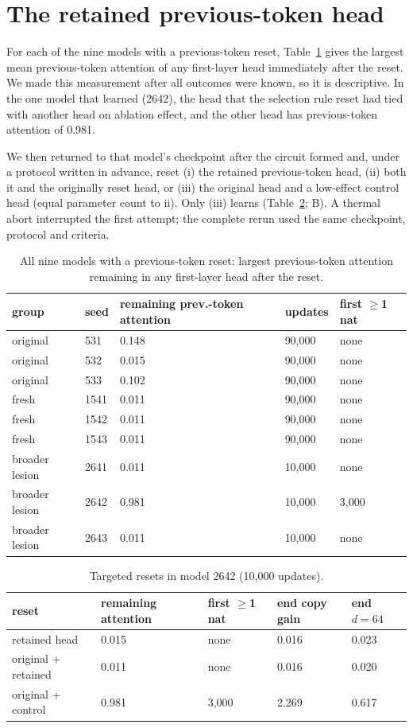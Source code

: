 \section{The retained previous-token head}
\label{app:retained}
For each of the nine models with a previous-token reset, Table~\ref{tab:readiness}
gives the largest mean previous-token attention of any first-layer head immediately
after the reset. We made this measurement after all outcomes were known, so it is
descriptive. In the one model that learned (2642), the head that the selection rule
reset had tied with another head on ablation effect, and the other head has
previous-token attention of 0.981.

We then returned to that model's checkpoint after the circuit formed and, under a
protocol written in advance, reset (i) the retained previous-token head, (ii) both
it and the originally reset head, or (iii) the original head and a low-effect
control head (equal parameter count to ii). Only (iii) learns
(Table~\ref{tab:retained}; B). A thermal abort interrupted the
first attempt; the complete rerun used the same checkpoint, protocol and criteria.

\begin{table}[!htbp]
\centering\small
\caption{All nine models with a previous-token reset: largest previous-token
attention remaining in any first-layer head after the reset.}
\label{tab:readiness}
\begin{tabular}{lllll}\toprule
group & seed & remaining prev.-token attention & updates & first $\ge$1 nat \\
\midrule
original & 531 & 0.148 & 90,000 & none \\
original & 532 & 0.015 & 90,000 & none \\
original & 533 & 0.102 & 90,000 & none \\
fresh & 1541 & 0.011 & 90,000 & none \\
fresh & 1542 & 0.011 & 90,000 & none \\
fresh & 1543 & 0.011 & 90,000 & none \\
broader lesion & 2641 & 0.011 & 10,000 & none \\
broader lesion & 2642 & 0.981 & 10,000 & 3,000 \\
broader lesion & 2643 & 0.011 & 10,000 & none \\
\bottomrule\end{tabular}
\end{table}

\begin{table}[!htbp]
\centering\small
\caption{Targeted resets in model 2642 (10,000 updates).}
\label{tab:retained}
\begin{tabular}{lllll}\toprule
reset & remaining attention & first $\ge$1 nat & end copy gain & end $d{=}64$ \\
\midrule
retained head & 0.015 & none & 0.016 & 0.023 \\
original + retained & 0.011 & none & 0.016 & 0.020 \\
original + control & 0.981 & 3,000 & 2.269 & 0.617 \\
\bottomrule\end{tabular}
\end{table}

